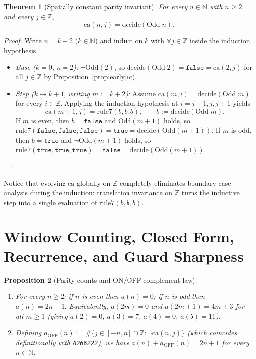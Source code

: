 \documentclass[11pt]{article}
\newtheorem{theorem}{Theorem}[section]
\newtheorem{proposition}[theorem]{Proposition}
\theoremstyle{definition}
\newcommand{\N}{\mathbb{N}}
\newcommand{\Z}{\mathbb{Z}}
\newcommand{\seq}[1]{\texttt{#1}}
\newcommand{\ca}{\mathrm{ca}}
\newcommand{\ruleSeven}{\mathrm{rule7}}
\newcommand{\btrue}{\mathtt{true}}
\newcommand{\bfalse}{\mathtt{false}}
\begin{document}
\begin{theorem}[Spatially constant parity invariant]
\label{thm:invariant}
For every $n \in \N$ with $n \ge 2$ and every $j \in \Z$,
\[
\ca(n, j) = \mathrm{decide}(\mathrm{Odd}\; n).
\]
\end{theorem}

\begin{proof}
Write $n = k + 2$ ($k \in \N$) and induct on $k$ with $\forall j \in \Z$ inside the induction hypothesis.
\begin{itemize}
\item \emph{Base ($k = 0$, $n = 2$):} $\neg\mathrm{Odd}(2)$, so $\mathrm{decide}(\mathrm{Odd}\; 2) = \bfalse = \ca(2, j)$ for all $j \in \Z$ by Proposition~\ref{prop:early}(c).
\item \emph{Step ($k \mapsto k + 1$, writing $m := k + 2$):} Assume $\ca(m, i) = \mathrm{decide}(\mathrm{Odd}\; m)$ for every $i \in \Z$. Applying the induction hypothesis at $i = j - 1, j, j + 1$ yields
\[
\ca(m + 1, j) = \ruleSeven(b, b, b), \qquad b := \mathrm{decide}(\mathrm{Odd}\; m).
\]
If $m$ is even, then $b = \bfalse$ and $\mathrm{Odd}(m + 1)$ holds, so $\ruleSeven(\bfalse, \bfalse, \bfalse) = \btrue = \mathrm{decide}(\mathrm{Odd}(m + 1))$. If $m$ is odd, then $b = \btrue$ and $\neg\mathrm{Odd}(m + 1)$ holds, so $\ruleSeven(\btrue, \btrue, \btrue) = \bfalse = \mathrm{decide}(\mathrm{Odd}(m + 1))$. \qedhere
\end{itemize}
\end{proof}

Notice that evolving $\ca$ globally on $\Z$ completely eliminates boundary case analysis during the induction: translation invariance on $\Z$ turns the inductive step into a single evaluation of $\ruleSeven(b, b, b)$.

\section{Window Counting, Closed Form, Recurrence, and Guard Sharpness}

\begin{proposition}[Parity counts and ON/OFF complement law]
\label{prop:counts}
\leavevmode
\begin{enumerate}
\item[\textup{(a)}] For every $n \ge 2$: if $n$ is even then $a(n) = 0$; if $n$ is odd then $a(n) = 2n + 1$. Equivalently, $a(2m) = 0$ and $a(2m + 1) = 4m + 3$ for all $m \ge 1$ (giving $a(2) = 0$, $a(3) = 7$, $a(4) = 0$, $a(5) = 11$).
\item[\textup{(b)}] Defining $a_{\mathrm{OFF}}(n) := \#\{j \in [-n, n] \cap \Z : \neg\ca(n, j)\}$ (which coincides definitionally with \seq{A266222}), we have $a(n) + a_{\mathrm{OFF}}(n) = 2n + 1$ for every $n \in \N$.
\end{enumerate}
\end{proposition}
\end{document}
